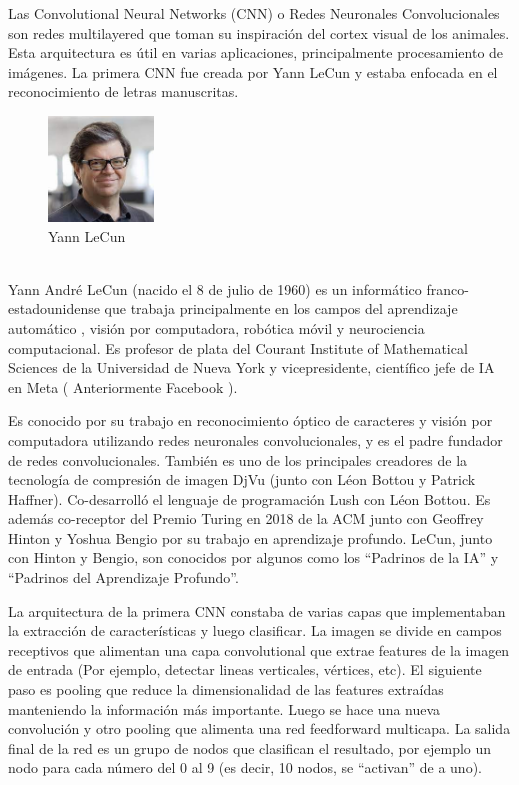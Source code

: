 \documentclass[a4paper]{article}
\begin{document}
Las Convolutional Neural Networks (CNN) o Redes Neuronales Convolucionales 
son redes multilayered que toman 
su inspiración del cortex visual de los animales. Esta 
arquitectura es útil en varias aplicaciones, principalmente 
procesamiento de imágenes. La primera CNN fue creada por Yann 
LeCun y estaba enfocada en el reconocimiento de letras 
manuscritas.

\begin{figure} %
    \centering
    \includegraphics[width=0.25\textwidth]{./images/Yann_LeCun.jpeg}
    \caption{Yann LeCun}
\end{figure}
\\
Yann André LeCun (nacido el 8 de julio de 1960) es un informático 
franco-estadounidense que trabaja principalmente en los campos del 
aprendizaje automático , visión por computadora, robótica móvil y 
neurociencia computacional. Es profesor de plata del Courant 
Institute of Mathematical Sciences de la Universidad de Nueva York 
y vicepresidente, científico jefe de IA en Meta ( Anteriormente 
Facebook ).

Es conocido por su trabajo en reconocimiento óptico de caracteres 
y visión por computadora utilizando redes neuronales 
convolucionales, y es el padre fundador de redes 
convolucionales. También es uno de los principales creadores de la 
tecnología de compresión de imagen DjVu (junto con Léon Bottou y 
Patrick Haffner). Co-desarrolló el lenguaje de programación Lush 
con Léon Bottou. Es además co-receptor del Premio Turing en 2018 de la ACM junto con 
Geoffrey Hinton y Yoshua Bengio por su trabajo en aprendizaje 
profundo. LeCun, junto con Hinton y Bengio, son conocidos por algunos como 
los ``Padrinos de la IA'' y ``Padrinos del Aprendizaje Profundo''. 

La arquitectura de la primera CNN constaba de varias capas que 
implementaban la extracción de características y luego clasificar. 
La imagen se divide en campos receptivos que alimentan una capa 
convolutional que extrae features de la imagen de entrada (Por 
ejemplo, detectar lineas verticales, vértices, etc). El siguiente 
paso es pooling que reduce la dimensionalidad de las features 
extraídas manteniendo la información más importante. Luego se hace 
una nueva convolución y otro pooling que alimenta una red 
feedforward multicapa. La salida final de la red es un grupo de 
nodos que clasifican el resultado, por ejemplo un nodo para cada 
número del 0 al 9 (es decir, 10 nodos, se ``activan'' de a uno).
\end{document}
